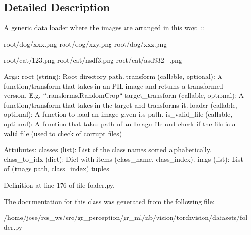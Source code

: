 \subsection{Detailed Description}
\begin{DoxyVerb}A generic data loader where the images are arranged in this way: ::

    root/dog/xxx.png
    root/dog/xxy.png
    root/dog/xxz.png

    root/cat/123.png
    root/cat/nsdf3.png
    root/cat/asd932_.png

Args:
    root (string): Root directory path.
    transform (callable, optional): A function/transform that  takes in an PIL image
        and returns a transformed version. E.g, ``transforms.RandomCrop``
    target_transform (callable, optional): A function/transform that takes in the
        target and transforms it.
    loader (callable, optional): A function to load an image given its path.
    is_valid_file (callable, optional): A function that takes path of an Image file
        and check if the file is a valid file (used to check of corrupt files)

 Attributes:
    classes (list): List of the class names sorted alphabetically.
    class_to_idx (dict): Dict with items (class_name, class_index).
    imgs (list): List of (image path, class_index) tuples
\end{DoxyVerb}
 

Definition at line 176 of file folder.\+py.



The documentation for this class was generated from the following file\+:\begin{DoxyCompactItemize}
\item 
/home/jose/ros\+\_\+ws/src/gr\+\_\+perception/gr\+\_\+ml/nb/vision/torchvision/datasets/folder.\+py\end{DoxyCompactItemize}
